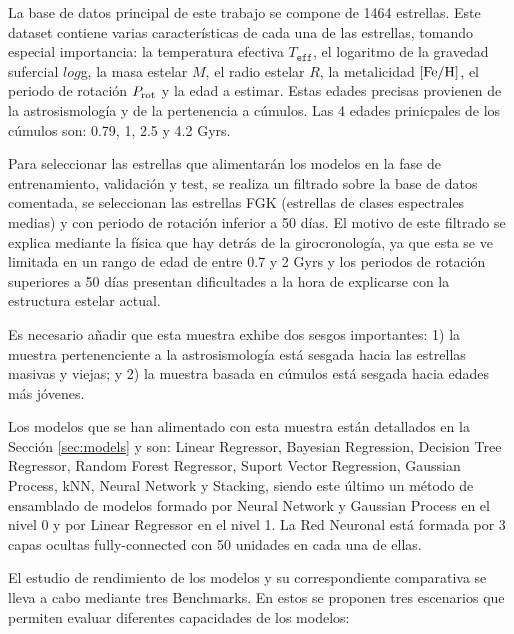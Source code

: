 \vspace{0.5cm}

La base de datos principal de este trabajo se compone de 1464 estrellas. Este dataset contiene varias características de cada una de las estrellas, tomando especial importancia: la temperatura efectiva $T_\texttt{eff}$, el logaritmo de la gravedad sufercial $log$g, la masa estelar $M$, el radio estelar $R$, la metalicidad ${\rm [Fe/H]}$, el periodo de rotación $P_{\rm rot}$ y la edad a estimar. Estas edades precisas provienen de la astrosismología y de la pertenencia a cúmulos. Las 4 edades prinicpales de los cúmulos son: 0.79, 1, 2.5 y 4.2 Gyrs.

Para seleccionar las estrellas que alimentarán los modelos en la fase de entrenamiento, validación y test, se realiza un filtrado sobre la base de datos comentada, se seleccionan las estrellas FGK (estrellas de clases espectrales medias) y con periodo de rotación inferior a 50 días. El motivo de este filtrado se explica mediante la física que hay detrás de la girocronología, ya que esta se ve limitada en un rango de edad de entre 0.7 y 2 Gyrs y los periodos de rotación superiores a 50 días presentan dificultades a la hora de explicarse con la estructura estelar actual.

Es necesario añadir que esta muestra exhibe dos sesgos importantes: 1) la muestra pertenenciente a la astrosismología está sesgada hacia las estrellas masivas y viejas; y 2) la muestra basada en cúmulos está sesgada hacia edades más jóvenes.

\vspace{0.5cm}

Los modelos que se han alimentado con esta muestra están detallados en la Sección \ref{sec:models} y son: Linear Regressor, Bayesian Regression, Decision Tree Regressor, Random Forest Regressor, Suport Vector Regression, Gaussian Process, kNN, Neural Network y Stacking, siendo este último un método de ensamblado de modelos formado por Neural Network y Gaussian Process en el nivel 0 y por Linear Regressor en el nivel 1. La Red Neuronal está formada por 3 capas ocultas fully-connected con 50 unidades en cada una de ellas.

El estudio de rendimiento de los modelos y su correspondiente comparativa se lleva a cabo mediante tres Benchmarks. En estos se proponen tres escenarios que permiten evaluar diferentes capacidades de los modelos:

\vspace{0.25cm}

